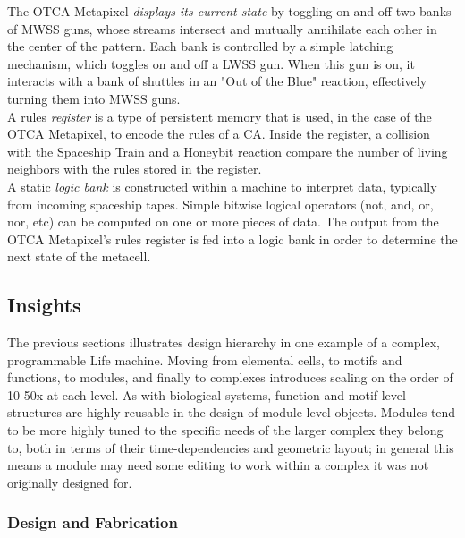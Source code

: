 {The OTCA Metapixel \textit{displays its current state} by toggling on and off two banks of MWSS guns, whose streams intersect and mutually annihilate each other in the center of the pattern.  Each bank is controlled by a simple latching mechanism, which toggles on and off a LWSS gun.  When this gun is on, it interacts with a bank of shuttles in an "Out of the Blue" reaction, effectively turning them into MWSS guns.\\

A rules \textit{register} is a type of persistent memory that is used, in the case of the OTCA Metapixel, to encode the rules of a CA.  Inside the register, a collision with the Spaceship Train and a Honeybit reaction compare the number of living neighbors with the rules stored in the register.\\

A static \textit{logic bank} is constructed within a machine to interpret data, typically from incoming spaceship tapes.  Simple bitwise logical operators (not, and, or, nor, etc) can be computed on one or more pieces of data.  The output from the OTCA Metapixel's rules register is fed into a logic bank in order to determine the next state of the metacell.

\subsection{Insights}

The previous sections illustrates design hierarchy in one example of a complex, programmable Life machine.  Moving from elemental cells, to motifs and functions, to modules, and finally to complexes introduces scaling on the order of 10-50x at each level.  As with biological systems, function and motif-level structures are highly reusable in the design of module-level objects.  Modules tend to be more highly tuned to the specific needs of the larger complex they belong to, both in terms of their time-dependencies and geometric layout; in general this means a module may need some editing to work within a complex it was not originally designed for.

\subsubsection{Design and Fabrication}

}
